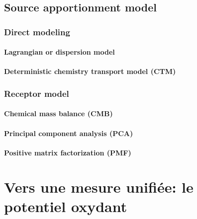 \subsection{Source apportionment model}%
\label{sec:source_apportionment_model}

\subsubsection{Direct modeling}%
\label{sub:direct_modeling}

\paragraph{Lagrangian or dispersion model}%
\label{sub:lagrangian_or_dispersion_model}

\paragraph{Deterministic chemistry transport model (CTM)}%
\label{sub:deterministic_chemistry_transport_model_ctm_}

\subsubsection{Receptor model}%
\label{sec:receptor_model}

\paragraph{Chemical mass balance (CMB)}%
\label{sub:chemical_mass_balance_cmb_}

\paragraph{Principal component analysis (PCA)}%
\label{sub:principal_component_analysis_pca_}

\paragraph{Positive matrix factorization (PMF)}%
\label{sub:positive_matrix_factorization_pmf_}


\section{Vers une mesure unifiée: le potentiel oxydant}%
\label{sec:le_potentiel_oxydant_des_aerosols}

